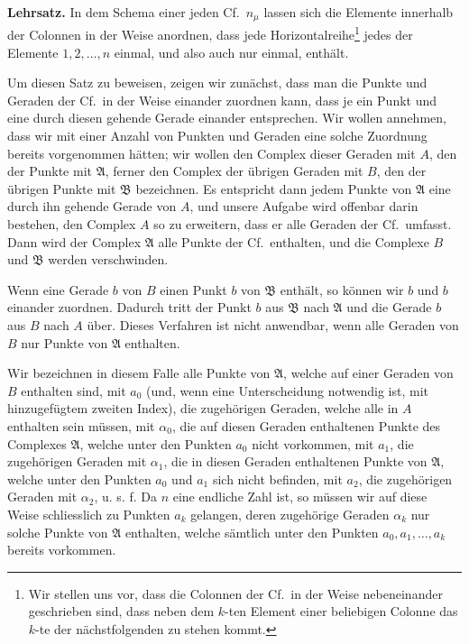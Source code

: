 \documentclass[11pt]{article}
\newcommand{\Cf}{\textup{Cf.}}
\begin{document}
\textbf{Lehrsatz.} In dem Schema einer jeden \Cf\ $n_\mu$ lassen sich die Elemente innerhalb der Colonnen in der Weise anordnen, dass jede Horizontalreihe\footnote{Wir stellen uns vor, dass die Colonnen der \Cf\ in der Weise nebeneinander geschrieben sind, dass neben dem $k$-ten Element einer beliebigen Colonne das $k$-te der nächstfolgenden zu stehen kommt.} jedes der Elemente $1,2,\ldots,n$ einmal, und also auch nur einmal, enthält.

Um diesen Satz zu beweisen, zeigen wir zunächst, dass man die Punkte und Geraden der \Cf\ in der Weise einander zuordnen kann, dass je ein Punkt und eine durch diesen gehende Gerade einander entsprechen. Wir wollen annehmen, dass wir mit einer Anzahl von Punkten und Geraden eine solche Zuordnung bereits vorgenommen hätten; wir wollen den Complex dieser Geraden mit $A$, den der Punkte mit $\mathfrak A$, ferner den Complex der übrigen Geraden mit $B$, den der übrigen Punkte mit $\mathfrak B$ bezeichnen. Es entspricht dann jedem Punkte von $\mathfrak A$ eine durch ihn gehende Gerade von $A$, und unsere Aufgabe wird offenbar darin bestehen, den Complex $A$ so zu erweitern, dass er alle Geraden der \Cf\ umfasst. Dann wird der Complex $\mathfrak A$ alle Punkte der \Cf\ enthalten, und die Complexe $B$ und $\mathfrak B$ werden verschwinden.

Wenn eine Gerade $b$ von $B$ einen Punkt $b$ von $\mathfrak B$ enthält, so können wir $b$ und $b$ einander zuordnen. Dadurch tritt der Punkt $b$ aus $\mathfrak B$ nach $\mathfrak A$ und die Gerade $b$ aus $B$ nach $A$ über. Dieses Verfahren ist nicht anwendbar, wenn alle Geraden von $B$ nur Punkte von $\mathfrak A$ enthalten.

Wir bezeichnen in diesem Falle alle Punkte von $\mathfrak A$, welche auf einer Geraden von $B$ enthalten sind, mit $a_0$ (und, wenn eine Unterscheidung notwendig ist, mit hinzugefügtem zweiten Index), die zugehörigen Geraden, welche alle in $A$ enthalten sein müssen, mit $\alpha_0$, die auf diesen Geraden enthaltenen Punkte des Complexes $\mathfrak A$, welche unter den Punkten $a_0$ nicht vorkommen, mit $a_1$, die zugehörigen Geraden mit $\alpha_1$, die in diesen Geraden enthaltenen Punkte von $\mathfrak A$, welche unter den Punkten $a_0$ und $a_1$ sich nicht befinden, mit $a_2$, die zugehörigen Geraden mit $\alpha_2$, u. s. f. Da $n$ eine endliche Zahl ist, so müssen wir auf diese Weise schliesslich zu Punkten $a_k$ gelangen, deren zugehörige Geraden $\alpha_k$ nur solche Punkte von $\mathfrak A$ enthalten, welche sämtlich unter den Punkten $a_0,a_1,\ldots,a_k$ bereits vorkommen.
\end{document}
